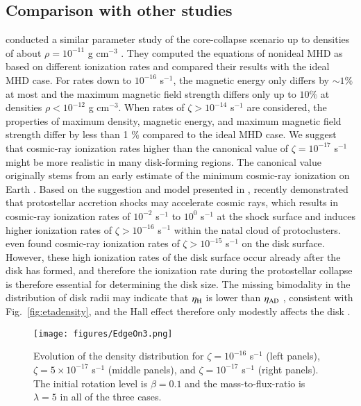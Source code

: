 \documentclass{aa}
\newcommand{\Fig}[1]{Fig.~\ref{fig:#1}}    %
\begin{document}
\subsection{Comparison with other studies}
\citet{Wurster2018CRIRstudy} conducted a similar parameter study of the core-collapse scenario up to densities of about $\rho=10^{-11}$ g cm$^{-3}$ 
. They computed the equations of nonideal MHD as based on different ionization rates 
and compared their results with the ideal MHD case. 
For rates down to $10^{-16}$ s$^{-1}$, the magnetic energy only differs by $\sim 1 \%$ at most and the maximum magnetic field strength differs only up to $10 \%$ 
at densities $\rho<10^{-12}$ g cm$^{-3}$.
When rates of $\zeta > 10^{-14}$ s$^{-1}$ are considered, the properties of maximum density, magnetic energy, and maximum magnetic field strength differ by less
than 1 $\%$ compared to the ideal MHD case. 
We suggest that cosmic-ray ionization rates higher than the canonical value of $\zeta = 10^{-17}$ s$^{-1}$ might be more realistic in many disk-forming regions.
The canonical value originally stems from an early estimate of the minimum cosmic-ray ionization on Earth \citep{SpitzerTomasko1968}.
Based on the suggestion and model presented in \citet{Padovani2016}, 
\citet{GachesOffner2018} recently demonstrated that protostellar accretion shocks may accelerate cosmic rays, which results in cosmic-ray ionization rates of 
$10^{-2}$ s$^{-1}$ to $10^{0}$ s$^{-1}$ at the shock surface and induces higher ionization rates of $\zeta > 10^{-16}$ s$^{-1}$ within the natal cloud of protoclusters.
\citet{Offner2019} even found cosmic-ray ionization rates of $\zeta > 10^{-15}$ s$^{-1}$ on the disk surface. 
However, these high ionization rates of the disk surface occur already after the disk has formed, and therefore the ionization rate during the protostellar collapse is therefore essential for determining the disk size.
The missing bimodality in the distribution of disk radii may indicate that $\eta_{\rm H}$ is lower than $\eta_{\rm AD}$ , consistent with \Fig{etadensity}, and the Hall effect therefore only modestly affects the disk \citep[see results for $\zeta > 10^{-16}$ s$^{-1}$ in][]{Wurster2018inVaytet}.  


\begin{figure*}
        \centering
    \texttt{[image: figures/EdgeOn3.png]}
        \caption{Evolution of the density distribution for $\zeta=10^{-16}$ s$^{-1}$ (left panels), $\zeta=5\times10^{-17}$ s$^{-1}$ (middle panels), and $\zeta=10^{-17}$ s$^{-1}$ (right panels). The initial rotation level is $\beta=0.1$ and the mass-to-flux-ratio is $\lambda=5$ in all of the three cases.     
        }
        \label{fig:rho_disks}
\end{figure*}
\end{document}
